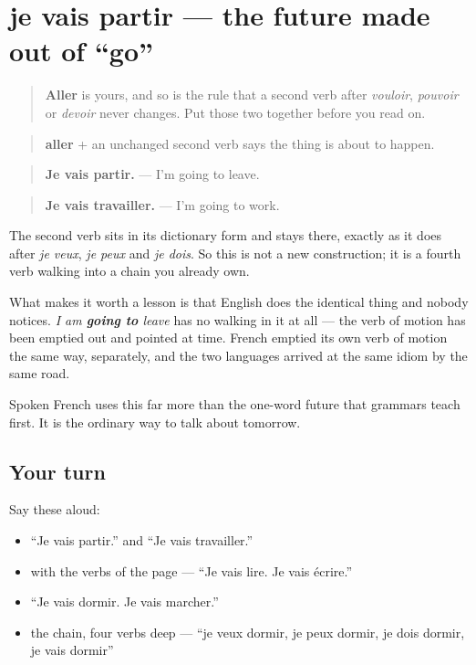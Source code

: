 \section[je vais partir]{je vais partir — the future made out of \textquotedblleft{}go\textquotedblright{}}

\label{lesson:FR-C37-futur-proche}



\begin{quote}
\textbf{Aller} is yours, and so is the rule that a second verb after \emph{vouloir}, \emph{pouvoir} or \emph{devoir} never changes. Put those two together before you read on.
\end{quote}

\begin{cousinweb}
\begin{quote}
\textbf{aller} + an unchanged second verb says the thing is about to happen.
\end{quote}

\begin{quote}
\textbf{Je vais partir.} — I'm going to leave.
\end{quote}

\begin{quote}
\textbf{Je vais travailler.} — I'm going to work.
\end{quote}

The second verb sits in its dictionary form and stays there, exactly as it does after \emph{je veux}, \emph{je peux} and \emph{je dois}. So this is not a new construction; it is a fourth verb walking into a chain you already own.

What makes it worth a lesson is that English does the identical thing and nobody notices. \emph{I am \textbf{going to} leave} has no walking in it at all — the verb of motion has been emptied out and pointed at time. French emptied its own verb of motion the same way, separately, and the two languages arrived at the same idiom by the same road.

Spoken French uses this far more than the one-word future that grammars teach first. It is the ordinary way to talk about tomorrow.
\end{cousinweb}

\subsection*{Your turn}
Say these aloud:

\begin{itemize}
\raggedright
  \item \textquotedblleft{}Je vais partir.\textquotedblright{} and \textquotedblleft{}Je vais travailler.\textquotedblright{}
  \item with the verbs of the page — \textquotedblleft{}Je vais lire. Je vais écrire.\textquotedblright{}
  \item \textquotedblleft{}Je vais dormir. Je vais marcher.\textquotedblright{}
  \item the chain, four verbs deep — \textquotedblleft{}je veux dormir, je peux dormir, je dois dormir, je vais dormir\textquotedblright{}
\end{itemize}

